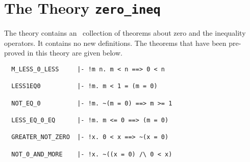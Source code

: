 \section{The Theory {\tt zero\_ineq}}

The theory  contains an
\adhoc\ collection of 
theorems about zero and the inequality operators. It contains no new
definitions. 
The theorems that have been pre-proved in this theory are given below.
\begin{hol}
\begin{verbatim}
  M_LESS_0_LESS     |- !m n. m < n ==> 0 < n

  LESS1EQ0          |- !m. m < 1 = (m = 0)

  NOT_EQ_0          |- !m. ~(m = 0) ==> m >= 1

  LESS_EQ_0_EQ      |- !m. m <= 0 ==> (m = 0)

  GREATER_NOT_ZERO  |- !x. 0 < x ==> ~(x = 0)

  NOT_0_AND_MORE    |- !x. ~((x = 0) /\ 0 < x)
\end{verbatim}\end{hol}
